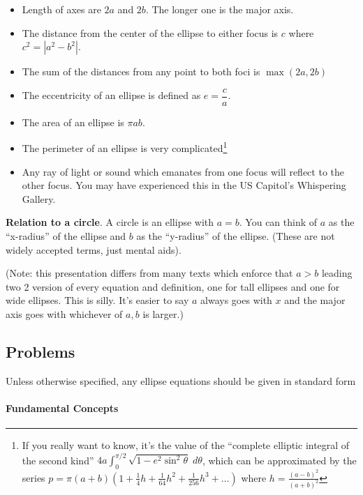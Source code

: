 \documentclass[11pt]{article}
\begin{document}
\begin{itemize}

\item
  Length of axes are \(2a\) and \(2b\). The longer one is the major
  axis.
\item
  The distance from the center of the ellipse to either focus is \(c\)
  where \(c^2 = |a^2-b^2|\).
\item
  The sum of the distances from any point to both foci is
  \(\max(2a,2b)\)
\item
  The eccentricity of an ellipse is defined as \(e = \dfrac{c}{a}\).
\item
  The area of an ellipse is \(\pi a b\).
\item
  The perimeter of an ellipse is very complicated\footnote{If you really
    want to know, it's the value of the ``complete elliptic integral of
    the second kind''
    \(4a \int_0^{\pi/2} \sqrt{1 - e^2 \sin^2 \theta} \; d\theta\), which
    can be approximated by the series
    \(p = \pi(a+b)\left(1 + \frac14 h + \frac{1}{64}h^2 + \frac{1}{256}h^3 + \ldots\right)\)
    where \(h = \frac{(a-b)^2}{(a+b)^2}\)}
\item
  Any ray of light or sound which emanates from one focus will reflect
  to the other focus. You may have experienced this in the US Capitol's
  Whispering Gallery.
\end{itemize}

\textbf{Relation to a circle}. A circle is an ellipse with \(a=b\). You
can think of \(a\) as the ``x-radius'' of the ellipse and \(b\) as the
``y-radius'' of the ellipse. (These are not widely accepted terms, just
mental aids).

(Note: this presentation differs from many texts which enforce that
\(a>b\) leading two 2 version of every equation and definition, one for
tall ellipses and one for wide ellipses. This is silly. It's easier to
say \(a\) always goes with \(x\) and the major axis goes with whichever
of \(a,b\) is larger.)

\hypertarget{problems}{%
\subsection{Problems}\label{problems}}

Unless otherwise specified, any ellipse equations should be given in
standard form

\hypertarget{fundamental-concepts}{%
\paragraph{Fundamental Concepts}\label{fundamental-concepts}}
\end{document}
